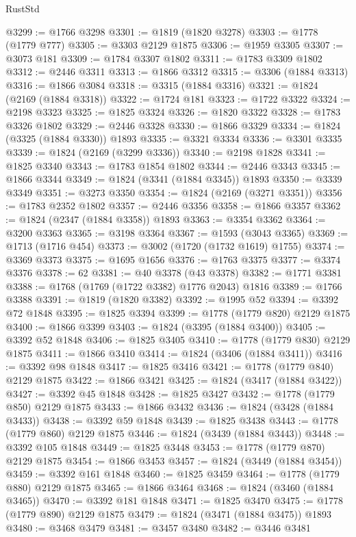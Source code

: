\begin{lexlean}{RustStd}
\begin{coremodule}
@3299 := @1766 @3298
@3301 := @1819 (@1820 @3278)
@3303 := @1778 (@1779 @777)
@3305 := @3303 @2129 @1875
@3306 := @1959 @3305
@3307 := @3073 @181
@3309 := @1784 @3307 @1802
@3311 := @1783 @3309 @1802
@3312 := @2446 @3311
@3313 := @1866 @3312
@3315 := @3306 (@1884 @3313)
@3316 := @1866 @3084
@3318 := @3315 (@1884 @3316)
@3321 := @1824 (@2169 (@1884 @3318))
@3322 := @1724 @181
@3323 := @1722 @3322
@3324 := @2198 @3323
@3325 := @1825 @3324
@3326 := @1820 @3322
@3328 := @1783 @3326 @1802
@3329 := @2446 @3328
@3330 := @1866 @3329
@3334 := @1824 (@3325 (@1884 @3330)) @1893
@3335 := @3321 @3334
@3336 := @3301 @3335
@3339 := @1824 (@2169 (@3299 @3336))
@3340 := @2198 @1828
@3341 := @1825 @3340
@3343 := @1783 @1854 @1802
@3344 := @2446 @3343
@3345 := @1866 @3344
@3349 := @1824 (@3341 (@1884 @3345)) @1893
@3350 := @3339 @3349
@3351 := @3273 @3350
@3354 := @1824 (@2169 (@3271 @3351))
@3356 := @1783 @2352 @1802
@3357 := @2446 @3356
@3358 := @1866 @3357
@3362 := @1824 (@2347 (@1884 @3358)) @1893
@3363 := @3354 @3362
@3364 := @3200 @3363
@3365 := @3198 @3364
@3367 := @1593 (@3043 @3365)
@3369 := @1713 (@1716 @454)
@3373 := @3002 (@1720 (@1732 @1619) @1755)
@3374 := @3369 @3373
@3375 := @1695 @1656
@3376 := @1763 @3375
@3377 := @3374 @3376
@3378 := 62
@3381 := @40 @3378 (@43 @3378)
@3382 := @1771 @3381
@3388 := @1768 (@1769 (@1722 @3382) @1776 @2043) @1816
@3389 := @1766 @3388
@3391 := @1819 (@1820 @3382)
@3392 := @1995 @52
@3394 := @3392 @72 @1848
@3395 := @1825 @3394
@3399 := @1778 (@1779 @820) @2129 @1875
@3400 := @1866 @3399
@3403 := @1824 (@3395 (@1884 @3400))
@3405 := @3392 @52 @1848
@3406 := @1825 @3405
@3410 := @1778 (@1779 @830) @2129 @1875
@3411 := @1866 @3410
@3414 := @1824 (@3406 (@1884 @3411))
@3416 := @3392 @98 @1848
@3417 := @1825 @3416
@3421 := @1778 (@1779 @840) @2129 @1875
@3422 := @1866 @3421
@3425 := @1824 (@3417 (@1884 @3422))
@3427 := @3392 @45 @1848
@3428 := @1825 @3427
@3432 := @1778 (@1779 @850) @2129 @1875
@3433 := @1866 @3432
@3436 := @1824 (@3428 (@1884 @3433))
@3438 := @3392 @59 @1848
@3439 := @1825 @3438
@3443 := @1778 (@1779 @860) @2129 @1875
@3446 := @1824 (@3439 (@1884 @3443))
@3448 := @3392 @105 @1848
@3449 := @1825 @3448
@3453 := @1778 (@1779 @870) @2129 @1875
@3454 := @1866 @3453
@3457 := @1824 (@3449 (@1884 @3454))
@3459 := @3392 @161 @1848
@3460 := @1825 @3459
@3464 := @1778 (@1779 @880) @2129 @1875
@3465 := @1866 @3464
@3468 := @1824 (@3460 (@1884 @3465))
@3470 := @3392 @181 @1848
@3471 := @1825 @3470
@3475 := @1778 (@1779 @890) @2129 @1875
@3479 := @1824 (@3471 (@1884 @3475)) @1893
@3480 := @3468 @3479
@3481 := @3457 @3480
@3482 := @3446 @3481

\end{coremodule}
\end{lexlean}
